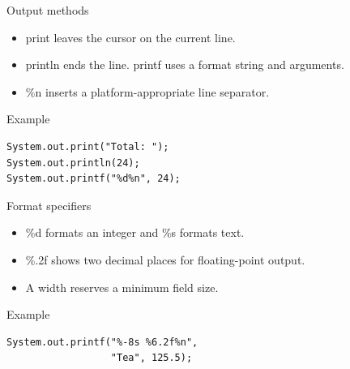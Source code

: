 \documentclass[10pt,aspectratio=169]{beamer}
\begin{document}
\begin{frame}[fragile,t]{Output methods}
\begin{itemize}
\item print leaves the cursor on the current line.
\item println ends the line. printf uses a format string and arguments.
\item \%n inserts a platform-appropriate line separator.
\end{itemize}
\vspace{1mm}\begin{block}{Example}
\begin{lstlisting}
System.out.print("Total: ");
System.out.println(24);
System.out.printf("%d%n", 24);
\end{lstlisting}
\end{block}
\end{frame}

\begin{frame}[fragile,t]{Format specifiers}
\begin{itemize}
\item \%d formats an integer and \%s formats text.
\item \%.2f shows two decimal places for floating-point output.
\item A width reserves a minimum field size.
\end{itemize}
\vspace{1mm}\begin{block}{Example}
\begin{lstlisting}
System.out.printf("%-8s %6.2f%n",
                  "Tea", 125.5);
\end{lstlisting}
\end{block}
\end{frame}
\end{document}
